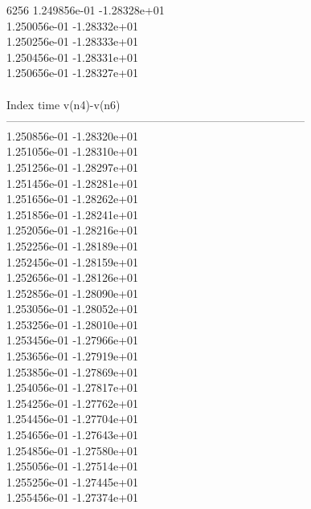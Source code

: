 6256	1.249856e-01	-1.28328e+01	\\ 	1.250056e-01	-1.28332e+01	\\ 	1.250256e-01	-1.28333e+01	\\ 	1.250456e-01	-1.28331e+01	\\ 	1.250656e-01	-1.28327e+01	\\ \hline
\\ \hline
Index   time            v(n4)-v(n6)     \\ \hline
--------------------------------------------------------------------------------\\ 	1.250856e-01	-1.28320e+01	\\ 	1.251056e-01	-1.28310e+01	\\ 	1.251256e-01	-1.28297e+01	\\ 	1.251456e-01	-1.28281e+01	\\ 	1.251656e-01	-1.28262e+01	\\ 	1.251856e-01	-1.28241e+01	\\ 	1.252056e-01	-1.28216e+01	\\ 	1.252256e-01	-1.28189e+01	\\ 	1.252456e-01	-1.28159e+01	\\ 	1.252656e-01	-1.28126e+01	\\ 	1.252856e-01	-1.28090e+01	\\ 	1.253056e-01	-1.28052e+01	\\ 	1.253256e-01	-1.28010e+01	\\ 	1.253456e-01	-1.27966e+01	\\ 	1.253656e-01	-1.27919e+01	\\ 	1.253856e-01	-1.27869e+01	\\ 	1.254056e-01	-1.27817e+01	\\ 	1.254256e-01	-1.27762e+01	\\ 	1.254456e-01	-1.27704e+01	\\ 	1.254656e-01	-1.27643e+01	\\ 	1.254856e-01	-1.27580e+01	\\ 	1.255056e-01	-1.27514e+01	\\ 	1.255256e-01	-1.27445e+01	\\ 	1.255456e-01	-1.27374e+01	\\ \hline
